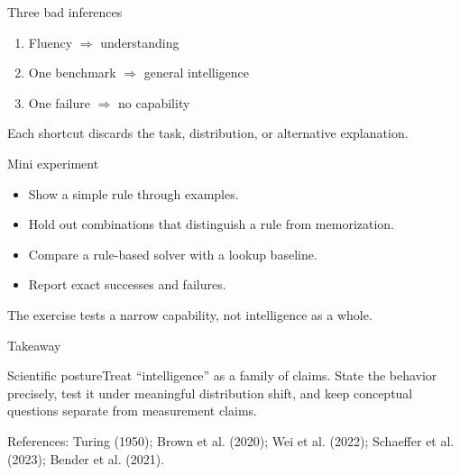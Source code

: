 \documentclass[aspectratio=169,10pt]{beamer}\usetheme{metropolis}
\begin{document}
\begin{frame}{Three bad inferences}\begin{enumerate}\item Fluency $\Rightarrow$ understanding\item One benchmark $\Rightarrow$ general intelligence\item One failure $\Rightarrow$ no capability\end{enumerate}\vfill Each shortcut discards the task, distribution, or alternative explanation.\end{frame}
\begin{frame}{Mini experiment}\begin{itemize}\item Show a simple rule through examples.\item Hold out combinations that distinguish a rule from memorization.\item Compare a rule-based solver with a lookup baseline.\item Report exact successes and failures.\end{itemize}\alert{The exercise tests a narrow capability, not intelligence as a whole.}\end{frame}
\begin{frame}{Takeaway}\begin{block}{Scientific posture}Treat ``intelligence'' as a family of claims. State the behavior precisely, test it under meaningful distribution shift, and keep conceptual questions separate from measurement claims.\end{block}\vfill\small References: Turing (1950); Brown et al. (2020); Wei et al. (2022); Schaeffer et al. (2023); Bender et al. (2021).\end{frame}
\end{document}
